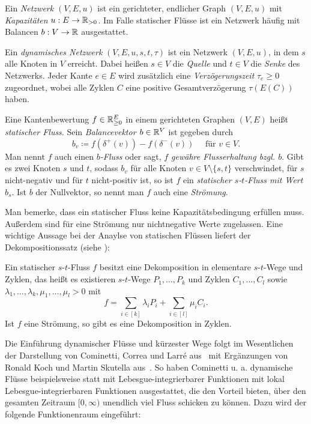 \begin{definition}
	Ein \emph{Netzwerk $(V, E, u)$} ist ein gerichteter, endlicher Graph $(V, E, u)$ mit \emph{Kapazitäten} $u: E \to \mathbb{R}_{>0}$.
	Im Falle statischer Flüsse ist ein Netzwerk häufig mit Balancen $b:V\to\mathbb{R}$ ausgestattet.
	
	Ein \emph{dynamisches Netzwerk} $(V, E, u, s, t, \tau)$ ist ein Netzwerk $(V, E, u)$, in dem $s$ alle Knoten in $V$ erreicht.
	Dabei heißen $s\in V$ die \emph{Quelle} und $t\in V$ die \emph{Senke} des Netzwerks.
	Jeder Kante $e\in E$ wird zusätzlich eine \emph{Verzögerungszeit} $\tau_e\geq 0$ zugeordnet, wobei alle Zyklen $C$ eine positive Gesamtverzögerung $\tau(E(C))$ haben.
\end{definition}
\begin{definition}
	Eine Kantenbewertung $f\in\mathbb{R}_{\geq 0}^E$ in einem gerichteten Graphen $(V, E)$ heißt \emph{statischer Fluss}.
	Sein \emph{Balancevektor $b\in \mathbb{R}^V$} ist gegeben durch
	\[ b_v \coloneq f(\delta^+(v)) - f(\delta^-(v)) \text{~~~ für $v\in V$}. \]
	Man nennt $f$ auch einen \emph{$b$-Fluss} oder sagt, \emph{$f$ gewähre Flusserhaltung bzgl. $b$}.
	Gibt es zwei Knoten $s$ und $t$, sodass $b_v$
	für alle Knoten $v\in V\setminus\{ s, t \}$ verschwindet, für $s$ nicht-negativ und für $t$ nicht-positiv ist, so ist $f$ ein \emph{statischer $s$-$t$-Fluss mit Wert $b_s$}.
	Ist $b$ der Nullvektor, so nennt man $f$ auch eine \emph{Strömung}.
\end{definition}

Man bemerke, dass ein statischer Fluss keine Kapazitätsbedingung erfüllen muss.
Außerdem sind für eine Strömung nur nichtnegative Werte zugelassen.
Eine wichtige Aussage bei der Anaylse von statischen Flüssen liefert der Dekompositionssatz (siehe \cite[Satz 8.8]{Korte2012}):
\begin{theorem}[Dekompositionssatz]\label{thm-decomposition}
	Ein statischer $s$-$t$-Fluss $f$ besitzt eine Dekomposition in elementare $s$-$t$-Wege und Zyklen, das heißt es existieren $s$-$t$-Wege $P_1,\dots,P_k$ und Zyklen $C_1, \dots, C_l$ sowie $\lambda_1,\dots,\lambda_k,\mu_1,\dots,\mu_l > 0$ mit \[
		f = \sum_{i\in[k]}\lambda_i P_i + \sum_{i\in[l]} \mu_i C_i.
	\]
	Ist $f$ eine Strömung, so gibt es eine Dekomposition in Zyklen.
\end{theorem}

Die Einführung dynamischer Flüsse und kürzester Wege folgt im Wesentlichen der Darstellung von Cominetti, Correa und Larré aus~\cite{Cominetti2015} mit Ergänzungen von Ronald Koch und Martin Skutella aus~\cite{Koch2011}.
So haben Cominetti u. a. dynamische Flüsse beispielsweise statt mit Lebesgue-integrierbarer Funktionen mit lokal Lebesgue-integrierbaren Funktionen ausgestattet, die den Vorteil bieten, über den gesamten Zeitraum $[0, \infty)$ unendlich viel Fluss schicken zu können.
Dazu wird der folgende Funktionenraum eingeführt:

